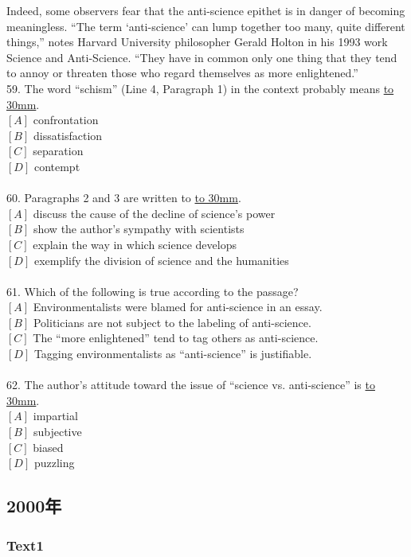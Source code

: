 \documentclass[a4paper]{article}
\begin{document}
\par
Indeed, some observers fear that the anti-science epithet is in danger of becoming meaningless. “The term ‘anti-science’ can lump together too many, quite different things,” notes Harvard University philosopher Gerald Holton in his 1993 work Science and Anti-Science. “They have in common only one thing that they tend to annoy or threaten those who regard themselves as more enlightened.”
\\59.	The word “schism” (Line 4, Paragraph 1) in the context probably means \underline{\hbox to 30mm{}}.\\$[A]$ confrontation\\$[B]$ dissatisfaction\\$[C]$ separation\\$[D]$ contempt\\\\60.	Paragraphs 2 and 3 are written to \underline{\hbox to 30mm{}}.\\$[A]$ discuss the cause of the decline of science’s power\\$[B]$ show the author’s sympathy with scientists\\$[C]$ explain the way in which science develops\\$[D]$ exemplify the division of science and the humanities\\\\61.	Which of the following is true according to the passage?\\$[A]$ Environmentalists were blamed for anti-science in an essay.\\$[B]$ Politicians are not subject to the labeling of anti-science.\\$[C]$ The “more enlightened” tend to tag others as anti-science.\\$[D]$ Tagging environmentalists as “anti-science” is justifiable.\\\\62.	The author’s attitude toward the issue of “science vs. anti-science” is \underline{\hbox to 30mm{}}.\\$[A]$ impartial\\$[B]$ subjective\\$[C]$ biased\\$[D]$ puzzling\\\subsection{2000年}
\subsubsection{Text1}
\end{document}

